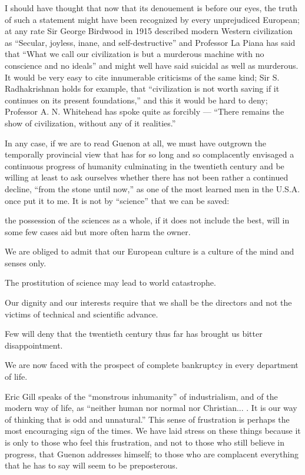 I should have thought that now that its denouement is before our eyes, the truth of such a statement might have been recognized by every unprejudiced European; at any rate Sir George Birdwood in 1915 described modern Western civilization as ``Secular, joyless, inane, and self-destructive'' and Professor La Piana has said that ``What we call our civilization is but a murderous machine with no conscience and no ideals'' and might well have said suicidal as well as murderous. It would be very easy to cite innumerable criticisms of the same kind; Sir S. Radhakrishnan holds for example, that ``civilization is not worth saving if it continues on its present foundations,'' and this it would be hard to deny; Professor A. N. Whitehead has spoke quite as forcibly --- ``There remains the show of civilization, without any of it realities.''

In any case, if we are to read Guenon at all, we must have outgrown the temporally provincial view that has for so long and so complacently envisaged a continuous progress of humanity culminating in the twentieth century and be willing at least to ask ourselves whether there has not been rather a continued decline, ``from the stone until now,'' as one of the most learned men in the U.S.A. once put it to me. It is not by ``science'' that we can be saved:

\begin{quotex}
the possession of the sciences as a whole, if it does not include the best, will in some few cases aid but more often harm the owner.

We are obliged to admit that our European culture is a culture of the mind and senses only.

The prostitution of science may lead to world catastrophe.

Our dignity and our interests require that we shall be the directors and not the victims of technical and scientific advance.

Few will deny that the twentieth century thus far has brought us bitter disappointment.

We are now faced with the prospect of complete bankruptcy in every department of life.
\end{quotex}


Eric Gill speaks of the ``monstrous inhumanity'' of industrialism, and of the modern way of life, as ``neither human nor normal nor Christian... . It is our way of thinking that is odd and unnatural.'' This sense of frustration is perhaps the most encouraging sign of the times. We have laid stress on these things because it is only to those who feel this frustration, and not to those who still believe in progress, that Guenon addresses himself; to those who are complacent everything that he has to say will seem to be preposterous.

